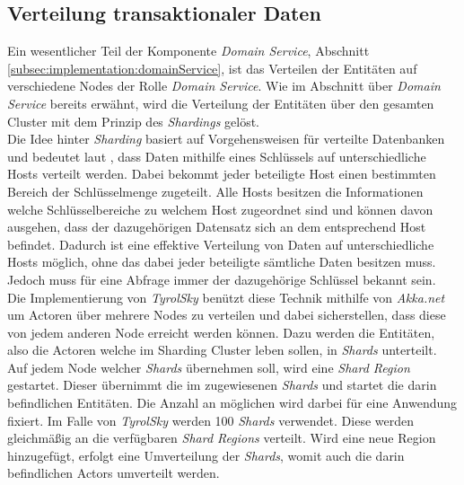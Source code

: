 \subsection{Verteilung transaktionaler Daten}
\label{subsec:implementation:akkaSharding}
Ein wesentlicher Teil der Komponente \textit{Domain Service}, Abschnitt \ref{subsec:implementation:domainService}, ist das Verteilen der Entitäten auf verschiedene Nodes der Rolle \textit{Domain Service}. Wie im Abschnitt über \textit{Domain Service} bereits erwähnt, wird die Verteilung der Entitäten über den gesamten Cluster mit dem Prinzip des \textit{Shardings} gelöst. \\
Die Idee hinter \textit{Sharding} basiert auf Vorgehensweisen für verteilte Datenbanken und bedeutet laut \cite{shardingCattell}, dass Daten mithilfe eines Schlüssels auf unterschiedliche Hosts verteilt werden. Dabei bekommt jeder beteiligte Host einen bestimmten Bereich der Schlüsselmenge zugeteilt. Alle Hosts besitzen die Informationen welche Schlüsselbereiche zu welchem Host zugeordnet sind und können davon ausgehen, dass der dazugehörigen Datensatz sich an dem entsprechend Host befindet. Dadurch ist eine effektive Verteilung von Daten auf unterschiedliche Hosts möglich, ohne das dabei jeder beteiligte sämtliche Daten besitzen muss. Jedoch muss für eine Abfrage immer der dazugehörige Schlüssel bekannt sein. \\
Die Implementierung von \textit{TyrolSky} benützt diese Technik mithilfe von \textit{Akka.net} um Actoren über mehrere Nodes zu verteilen und dabei sicherstellen, dass diese von jedem anderen Node erreicht werden können. Dazu werden die Entitäten, also die Actoren welche im Sharding Cluster leben sollen, in \textit{Shards} unterteilt. Auf jedem Node welcher \textit{Shards} übernehmen soll, wird eine \textit{Shard Region} gestartet. Dieser übernimmt die im zugewiesenen \textit{Shards} und startet die darin befindlichen Entitäten. Die Anzahl an möglichen  wird darbei für eine Anwendung fixiert. Im Falle von \textit{TyrolSky} werden {100} \textit{Shards} verwendet. Diese werden gleichmäßig an die verfügbaren \textit{Shard Regions} verteilt. Wird eine neue Region hinzugefügt, erfolgt eine Umverteilung der \textit{Shards}, womit auch die darin befindlichen Actors umverteilt werden. 

